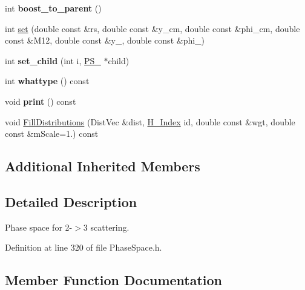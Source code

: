 \begin{DoxyCompactItemize}
\item 
\hypertarget{classPS__2__3_ad6c103ccf419ec6f416c54866d305fd0}{}int {\bfseries boost\+\_\+to\+\_\+parent} ()\label{classPS__2__3_ad6c103ccf419ec6f416c54866d305fd0}

\item 
int \hyperlink{classPS__2__3_a278af8edd62fe80330a5dc5f2d385bf5}{set} (double const \&rs, double const \&y\+\_\+cm, double const \&phi\+\_\+cm, double const \&M12, double const \&y\+\_, double const \&phi\+\_)
\item 
\hypertarget{classPS__2__3_a2da075a0d45b58fd9b4b50f6185a7368}{}int {\bfseries set\+\_\+child} (int i, \hyperlink{classPS__2}{P\+S\+\_} $\ast$child)\label{classPS__2__3_a2da075a0d45b58fd9b4b50f6185a7368}

\item 
\hypertarget{classPS__2__3_ab7105d8734ec97b22c0104bd451d619b}{}int {\bfseries whattype} () const \label{classPS__2__3_ab7105d8734ec97b22c0104bd451d619b}

\item 
\hypertarget{classPS__2__3_a98b7559fbc72002c2dd6dadb1db9be0b}{}void {\bfseries print} () const \label{classPS__2__3_a98b7559fbc72002c2dd6dadb1db9be0b}

\item 
void \hyperlink{classPS__2__3_a9beba1918553b1878e6654c70edf9387}{Fill\+Distributions} (Dist\+Vec \&dist, \hyperlink{HistArray_8h_abdf25c9f0ab78c4243f63cb2bacf26d9}{H\+\_\+\+Index} id, double const \&wgt, double const \&m\+Scale=1.) const 
\end{DoxyCompactItemize}
\subsection*{Additional Inherited Members}


\subsection{Detailed Description}
Phase space for 2-\/$>$3 scattering. 

Definition at line 320 of file Phase\+Space.\+h.



\subsection{Member Function Documentation}
\hypertarget{classPS__2__3_a9beba1918553b1878e6654c70edf9387}{}
